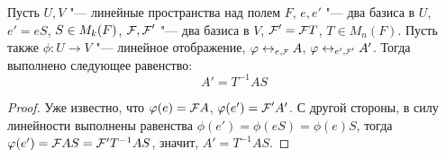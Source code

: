     \begin{proposition}
    	Пусть $U, V$ "--- линейные пространства над полем $F$, $e, e'$ "--- два базиса в $U$, $e' = eS$, $S \hm{\in} M_{k}(F)$, $\FF , \FF '$ "--- два базиса в $V$, $\FF ' = \FF T$, $T \in M_{n}(F)$. Пусть также $\phi: U \rightarrow V$ "--- линейное отображение, $\phi \leftrightarrow_{e, \FFF} A$, $\phi \leftrightarrow_{e', \FFF'}{} A'$. Тогда выполнено следующее равенство:
    	\[A' = T^{-1}AS\]
    \end{proposition}
    
    \begin{proof}
    	Уже известно, что $\phi(e) = \FF A$, $\phi(e') = \FF 'A'$. С другой стороны, в силу линейности выполнены равенства $\phi(e') = \phi(eS) = \phi(e)S$, тогда $\phi({e'}) = \FF AS = \mathcal{F'}T^{-1}AS$, значит, $A' = T^{-1}AS$.
    \end{proof}
    